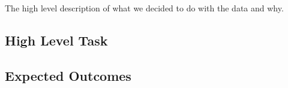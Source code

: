 The high level description of what we decided to do with the data and why.


\subsection{High Level Task}

\subsection{Expected Outcomes}

